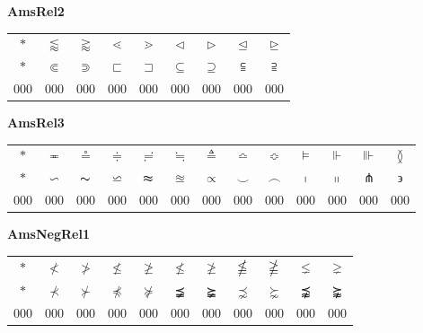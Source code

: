 \documentclass[12pt]{report}
\newlength{\mine}
\newlength{\niz}
\def\pmb{}
\begin{document}
\textbf{AmsRel2}
\par\nobreak\vspace{2mm}
\begin{tabular}{|c|cccccccc|}
  \hline
   $\pmb *$&
   $\pmb\lessapprox $&
   $\pmb\gtrapprox $&
   $\pmb\lessdot $&
   $\pmb\gtrdot $&
   $\pmb\vartriangleleft $&
   $\pmb\vartriangleright $&
   $\pmb\trianglelefteq $&
   $\pmb\trianglerighteq $\\[\mine]
   $\pmb *$&
   $\pmb\Subset $&
   $\pmb\Supset $&
   $\pmb\sqsubset $&
   $\pmb\sqsupset $&
   $\pmb\subseteq $&
   $\pmb\supseteq $&
   $\pmb\subseteqq $&
   $\pmb\supseteqq $\\[\niz]
  \hline\hline
  000&000&000&000&000&000&000&000&000\\
  \hline
\end{tabular}
\goodbreak\par\vspace{3mm}

\textbf{AmsRel3}
\par\nobreak\vspace{2mm}
\begin{tabular}{|c|cccccccccccc|}
  \hline
   $\pmb *$&
   $\pmb\eqcirc $&
   $\pmb\circeq $&
   $\pmb\doteqdot $&
   $\pmb\risingdotseq $&
   $\pmb\fallingdotseq $&
   $\pmb\triangleq $&
   $\pmb\bumpeq $&
   $\pmb\Bumpeq $&
   $\pmb\vDash $&
   $\pmb\Vdash $&
   $\pmb\Vvdash $&
   $\pmb\between $\\[\mine]
   $\pmb *$&
   $\pmb\backsim $&
   $\pmb\thicksim $&
   $\pmb\backsimeq $&
   $\pmb\thickapprox $&
   $\pmb\approxeq $&
   $\pmb\varpropto $&
   $\pmb\smallsmile $&
   $\pmb\smallfrown $&
   $\pmb\shortmid $&
   $\pmb\shortparallel $&
   $\pmb\pitchfork $&
   $\pmb\backepsilon $\\[\niz]
  \hline\hline
  000&000&000&000&000&000&000&000&000&000&000&000&000\\
  \hline
\end{tabular}
\goodbreak\par\vspace{3mm}

\newpage

\textbf{AmsNegRel1}
\par\nobreak\vspace{2mm}
\begin{tabular}{|c|cccccccccc|}
  \hline
   $\pmb *$&
   $\pmb\nless $&
   $\pmb\ngtr $&
   $\pmb\nleq $&
   $\pmb\ngeq $&
   $\pmb\nleqslant $&
   $\pmb\ngeqslant $&
   $\pmb\nleqq $&
   $\pmb\ngeqq $&
   $\pmb\lneq $&
   $\pmb\gneq $\\[\mine]
   $\pmb *$&
   $\pmb\nprec $&
   $\pmb\nsucc $&
   $\pmb\npreceq $&
   $\pmb\nsucceq $&
   $\pmb\precneqq $&
   $\pmb\succneqq $&
   $\pmb\precnsim $&
   $\pmb\succnsim $&
   $\pmb\precnapprox $&
   $\pmb\succnapprox $\\[\niz]
  \hline\hline
  000&000&000&000&000&000&000&000&000&000&000\\
  \hline
\end{tabular}
\goodbreak\par\vspace{3mm}
\end{document}
